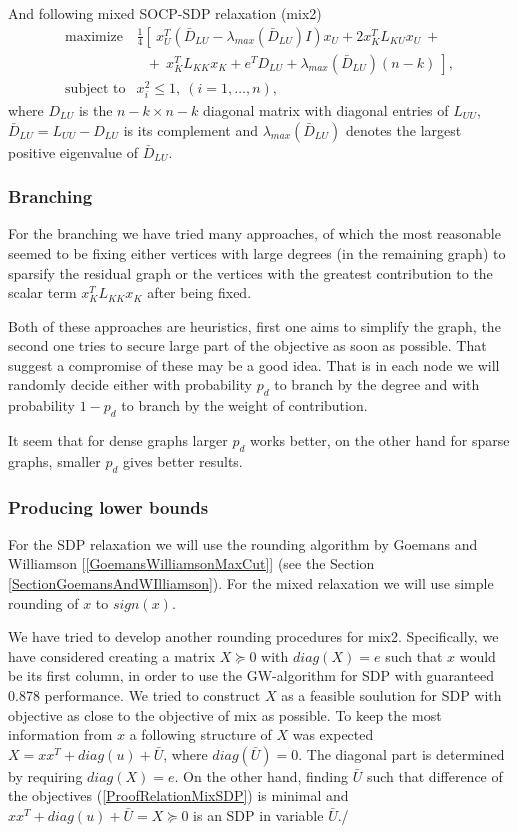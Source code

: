 \documentclass[12pt]{book}
\theoremstyle{definition}
\begin{document}
And following mixed SOCP-SDP relaxation (mix2)
\begin{equation*}
\begin{array}{ll}
\mbox{maximize} & \frac{1}{4}\left[ \ x_U^T(\bar{D}_{LU} - \lambda_{max}(\bar{D}_{LU})I)x_U  + 2x^T_KL_{KU}x_U \ +  \ \right. \\
	& \left. \ \ \ + \ x^T_KL_{KK}x_K + e^TD_{LU} + \lambda_{max}(\bar{D}_{LU})(n-k)  \ \right], \\
\mbox{subject to} &  x_i^2 \leq 1, \ (i=1,\dots ,n),
\end{array}
\end{equation*}
where $D_{LU}$ is the $n-k\times n-k$ diagonal matrix  with diagonal entries of $L_{UU}$, $\bar{D}_{LU} = L_{UU} - D_{LU}$ is its complement and $\lambda_{max}(\bar{D}_{LU})$ denotes the largest positive eigenvalue of $\bar{D}_{LU}.$


\subsubsection{Branching}
For the branching we have tried many approaches, of which the most reasonable seemed to be fixing either vertices with large degrees (in the remaining graph) to sparsify the residual graph or the vertices with the greatest contribution to the scalar term $x_K^TL_{KK}x_K$ after being fixed.

Both of these approaches are heuristics, first one aims to simplify the graph, the second one tries to secure large part of the objective as soon as possible. That suggest a compromise of these may be a good idea. That is in each node we will randomly decide either with probability $p_{d}$ to branch by the degree and with probability $1-p_d$ to branch by the weight of contribution.

It seem that for dense graphs larger $p_d$ works better, on the other hand for sparse graphs, smaller $p_d$ gives better results.

\subsubsection{Producing lower bounds}
For the SDP relaxation we will use the rounding algorithm by Goemans and Williamson [\ref{GoemansWilliamsonMaxCut}] (see the Section \ref{SectionGoemansAndWIlliamson}). For the mixed relaxation we will use simple rounding of $x$ to $sign(x)$.

\rem We have tried to develop another rounding procedures for mix2. Specifically, we have considered creating a matrix $X\succeq 0$ with $diag(X) = e$ such that $x$ would be its first column, in order to use the GW-algorithm for SDP with guaranteed 0.878 performance. We tried to construct $X$ as a feasible soulution for SDP with objective as close to the objective of mix as possible. To keep the most information from $x$ a following structure of $X$ was expected
$X = xx^T + diag(u) + \bar{U}$, where $diag(\bar{U}) = 0$. The diagonal part is determined by requiring $diag(X) = e$. On the other hand, finding $\bar{U}$  such that difference of the objectives (\ref{ProofRelationMixSDP}) is minimal and $xx^T + diag(u) + \bar{U} = X \succeq 0$ is an SDP in variable $\bar{U}.$/
\end{document}
